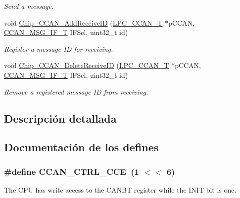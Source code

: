 \begin{DoxyCompactItemize}
\begin{DoxyCompactList}\small\item\em Send a message. \end{DoxyCompactList}\item 
void \hyperlink{group___c_c_a_n__18_x_x__43_x_x_gac0622af68b92aff26c9843d7536224c2}{Chip\+\_\+\+C\+C\+A\+N\+\_\+\+Add\+Receive\+ID} (\hyperlink{struct_l_p_c___c_c_a_n___t}{L\+P\+C\+\_\+\+C\+C\+A\+N\+\_\+T} $\ast$p\+C\+C\+AN, \hyperlink{group___c_c_a_n__18_x_x__43_x_x_gac90da0138c430750d2d7d55d4448cae7}{C\+C\+A\+N\+\_\+\+M\+S\+G\+\_\+\+I\+F\+\_\+T} I\+F\+Sel, uint32\+\_\+t id)
\begin{DoxyCompactList}\small\item\em Register a message ID for receiving. \end{DoxyCompactList}\item 
void \hyperlink{group___c_c_a_n__18_x_x__43_x_x_ga58ab5f836908b1611bd07ea9476172d6}{Chip\+\_\+\+C\+C\+A\+N\+\_\+\+Delete\+Receive\+ID} (\hyperlink{struct_l_p_c___c_c_a_n___t}{L\+P\+C\+\_\+\+C\+C\+A\+N\+\_\+T} $\ast$p\+C\+C\+AN, \hyperlink{group___c_c_a_n__18_x_x__43_x_x_gac90da0138c430750d2d7d55d4448cae7}{C\+C\+A\+N\+\_\+\+M\+S\+G\+\_\+\+I\+F\+\_\+T} I\+F\+Sel, uint32\+\_\+t id)
\begin{DoxyCompactList}\small\item\em Remove a registered message ID from receiving. \end{DoxyCompactList}\end{DoxyCompactItemize}


\subsection{Descripción detallada}


\subsection{Documentación de los \textquotesingle{}defines\textquotesingle{}}
\subsubsection[{\texorpdfstring{C\+C\+A\+N\+\_\+\+C\+T\+R\+L\+\_\+\+C\+CE}{CCAN_CTRL_CCE}}]{\setlength{\rightskip}{0pt plus 5cm}\#define C\+C\+A\+N\+\_\+\+C\+T\+R\+L\+\_\+\+C\+CE~(1 $<$$<$ 6)}\hypertarget{group___c_c_a_n__18_x_x__43_x_x_gaa65884720eb6b15b0acbff51e6be75b6}{}\label{group___c_c_a_n__18_x_x__43_x_x_gaa65884720eb6b15b0acbff51e6be75b6}
The C\+PU has write access to the C\+A\+N\+BT register while the I\+N\+IT bit is one. 

